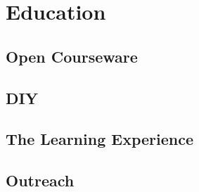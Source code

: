\chapter{Education}

\section{Open Courseware}

\section{DIY}

\section{The Learning Experience}

\section{Outreach}
